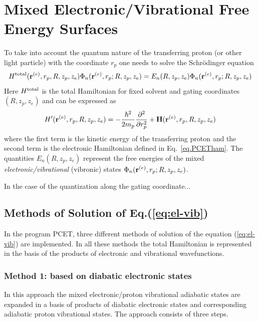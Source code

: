 \documentclass[oneside,11pt,openany]{book}
\begin{document}
\section{Mixed Electronic/Vibrational Free Energy Surfaces}
To take into account the quantum nature of the transferring proton
(or other light particle) with the coordinate $r_p$ one needs to
solve the Schr\"odinger equation
\begin{equation}
H^{\rm total}({\bf r}^{(e)},r_p,R,z_p,z_e) \Phi_n({\bf r}^{(e)},r_p;R,z_p,z_e)=
E_n(R,z_p,z_e) \Phi_n({\bf r}^{(e)},r_p;R,z_p,z_e)
\label{eq:el-vib}
\end{equation}
Here $H^{\rm total}$ is the total Hamiltonian for fixed solvent and gating
coordinates $(R,z_p,z_e)$ and can be expressed as
%
\begin{equation}
H'({\bf r}^{(e)},r_p,R,z_p,z_e)
= -\frac{\hbar^2}{2m_p}\frac{\partial^2}{\partial r_p^2} +
{\bf H}({\bf r}^{(e)},r_p,R,z_p,z_e)
\label{eq.hprime}
\end{equation}
where the first term is the kinetic energy of the transferring
proton and the second term is the electronic
Hamiltonian defined in Eq.~\ref{eq.PCETham}. The quantities
$E_n(R,z_p,z_e)$ represent the free energies of the mixed
{\em electronic/vibrational} (vibronic) states
$\Phi_n({\bf r}^{(e)},r_p;R,z_p,z_e)$.

In the case of the quantization along the gating coordinate...

\subsection{Methods of Solution of Eq.(\ref{eq:el-vib})}

In the program PCET, three different methods of solution
of the equation (\ref{eq:el-vib}) are implemented. In
all these methods the total Hamiltonian is represented
in the basis of the products of electronic and vibrational
wavefunctions.

\subsubsection{Method 1: based on diabatic electronic states}
In this approach the mixed electronic/proton
vibrational adiabatic states are expanded in a basis of
products of diabatic electronic states and corresponding
adiabatic proton vibrational states. The approach consists
of three steps.
\end{document}
